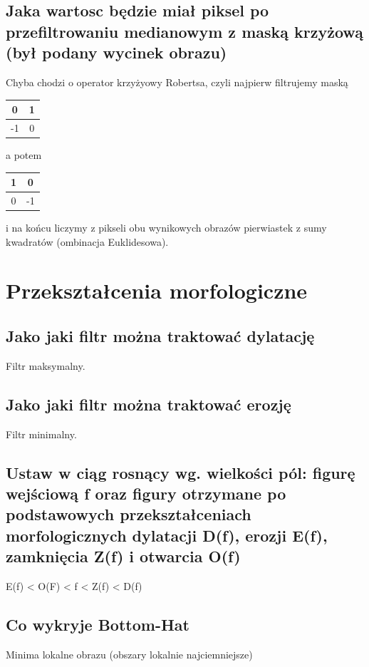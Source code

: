 \documentclass[a4paper, 12pt, titlepage]{article}
\begin{document}
\subsection{Jaka wartosc będzie miał piksel po przefiltrowaniu medianowym z maską krzyżową (był podany wycinek obrazu)}
Chyba chodzi o operator krzyżyowy Robertsa, czyli najpierw filtrujemy maską 
\begin{tabular}{|c|c|}
	\hline
	0 & 1 \\ \hline
	-1 & 0 \\ \hline
\end{tabular} a potem
\begin{tabular}{|c|c|}
	\hline
	1 & 0 \\ \hline
	0 & -1 \\ \hline
\end{tabular} i na końcu liczymy z pikseli obu wynikowych obrazów pierwiastek z sumy kwadratów (ombinacja Euklidesowa). 


\pagebreak\section{Przekształcenia morfologiczne}

\subsection{Jako jaki filtr można traktować dylatację}
Filtr maksymalny.

\subsection{Jako jaki filtr można traktować erozję}
Filtr minimalny.

\subsection{Ustaw w ciąg rosnący wg. wielkości pól: figurę wejściową f oraz figury otrzymane po podstawowych przekształceniach morfologicznych dylatacji D(f), erozji E(f), zamknięcia Z(f) i otwarcia O(f)}
E(f) < O(F) < f < Z(f) < D(f)

\subsection{Co wykryje Bottom-Hat}
Minima lokalne obrazu (obszary lokalnie najciemniejsze)
\end{document}
